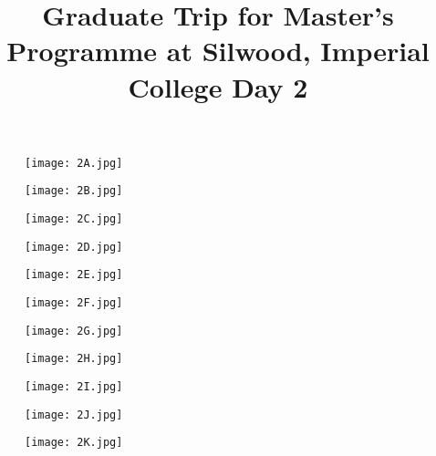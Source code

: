 \documentclass[11pt]{article}
\title{Graduate Trip for Master's Programme at Silwood, Imperial College \newline Day 2}
\begin{document}
  \maketitle
  
  \newpage

  \linenumbers

\begin{figure}[H]
    \centering
    \texttt{[image: 2A.jpg]}
\end{figure}

\begin{figure}[H]
    \centering
    \texttt{[image: 2B.jpg]}
\end{figure}

\begin{figure}[H]
    \centering
    \texttt{[image: 2C.jpg]}
\end{figure}

\begin{figure}[H]
    \centering
    \texttt{[image: 2D.jpg]}
\end{figure}

\begin{figure}[H]
    \centering
    \texttt{[image: 2E.jpg]}
\end{figure}

\begin{figure}[H]
    \centering
    \texttt{[image: 2F.jpg]}
\end{figure}

\begin{figure}[H]
    \centering
    \texttt{[image: 2G.jpg]}
\end{figure}

\begin{figure}[H]
    \centering
    \texttt{[image: 2H.jpg]}
\end{figure}

\begin{figure}[H]
    \centering
    \texttt{[image: 2I.jpg]}
\end{figure}

\begin{figure}[H]
    \centering
    \texttt{[image: 2J.jpg]}
\end{figure}

\begin{figure}[H]
    \centering
    \texttt{[image: 2K.jpg]}
\end{figure}
\end{document}
